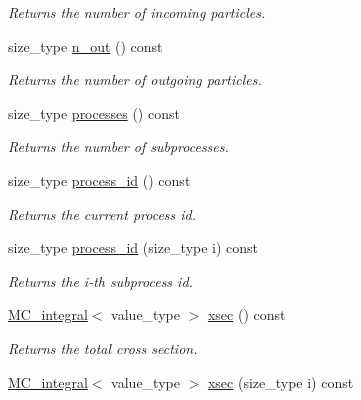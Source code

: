 \begin{DoxyCompactItemize}
\begin{DoxyCompactList}\small\item\em Returns the number of incoming particles. \end{DoxyCompactList}\item 
\hypertarget{a00210_aa1cafe423eddf568bd98d13ed8490a61}{size\-\_\-type \hyperlink{a00210_aa1cafe423eddf568bd98d13ed8490a61}{n\-\_\-out} () const }\label{a00210_aa1cafe423eddf568bd98d13ed8490a61}

\begin{DoxyCompactList}\small\item\em Returns the number of outgoing particles. \end{DoxyCompactList}\item 
\hypertarget{a00210_aa1c94ab0c0ae13e3276133e09bc8599a}{size\-\_\-type \hyperlink{a00210_aa1c94ab0c0ae13e3276133e09bc8599a}{processes} () const }\label{a00210_aa1c94ab0c0ae13e3276133e09bc8599a}

\begin{DoxyCompactList}\small\item\em Returns the number of subprocesses. \end{DoxyCompactList}\item 
\hypertarget{a00210_a31ce4caa34a16c247b9d4fa2117fd600}{size\-\_\-type \hyperlink{a00210_a31ce4caa34a16c247b9d4fa2117fd600}{process\-\_\-id} () const }\label{a00210_a31ce4caa34a16c247b9d4fa2117fd600}

\begin{DoxyCompactList}\small\item\em Returns the current process id. \end{DoxyCompactList}\item 
\hypertarget{a00210_a74a95eb0629e7bceef53c7f28dcab8a3}{size\-\_\-type \hyperlink{a00210_a74a95eb0629e7bceef53c7f28dcab8a3}{process\-\_\-id} (size\-\_\-type i) const }\label{a00210_a74a95eb0629e7bceef53c7f28dcab8a3}

\begin{DoxyCompactList}\small\item\em Returns the i-\/th subprocess id. \end{DoxyCompactList}\item 
\hypertarget{a00210_acdfd9250cf629888ae57719e7891956d}{\hyperlink{a00363}{M\-C\-\_\-integral}$<$ value\-\_\-type $>$ \hyperlink{a00210_acdfd9250cf629888ae57719e7891956d}{xsec} () const }\label{a00210_acdfd9250cf629888ae57719e7891956d}

\begin{DoxyCompactList}\small\item\em Returns the total cross section. \end{DoxyCompactList}\item 
\hypertarget{a00210_a01a34361ecf9e40142b76a4aef80b2ae}{\hyperlink{a00363}{M\-C\-\_\-integral}$<$ value\-\_\-type $>$ \hyperlink{a00210_a01a34361ecf9e40142b76a4aef80b2ae}{xsec} (size\-\_\-type i) const }\label{a00210_a01a34361ecf9e40142b76a4aef80b2ae}


\end{DoxyCompactItemize}
